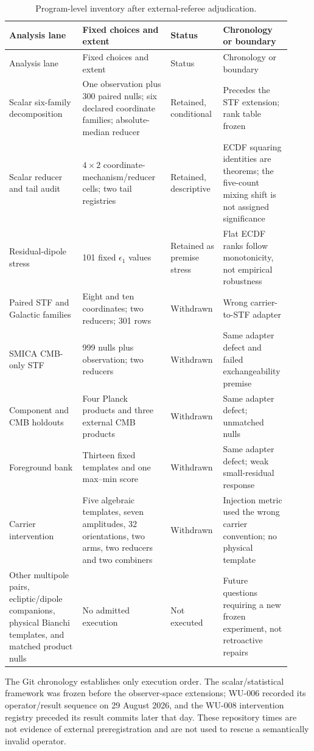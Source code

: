 \documentclass[11pt,a4paper]{article}
\begin{document}
\begin{longtable}{@{}p{0.25\linewidth}p{0.30\linewidth}p{0.15\linewidth}p{0.22\linewidth}@{}}
\caption{Program-level inventory after external-referee adjudication.}
\label{tab:analysis-inventory}\\
\toprule
Analysis lane & Fixed choices and extent & Status & Chronology or boundary\\
\midrule
\endfirsthead
\toprule
Analysis lane & Fixed choices and extent & Status & Chronology or boundary\\
\midrule
\endhead
Scalar six-family decomposition & One observation plus 300 paired nulls;
six declared coordinate families; absolute-median reducer & Retained,
conditional & Precedes the STF extension; rank table frozen\\
Scalar reducer and tail audit & $4\times2$ coordinate-mechanism/reducer cells;
two tail registries & Retained, descriptive & ECDF squaring identities are
theorems; the five-count mixing shift is not assigned significance\\
Residual-dipole stress & 101 fixed $\epsilon_1$ values & Retained as premise
stress & Flat ECDF ranks follow monotonicity, not empirical robustness\\
Paired STF and Galactic families & Eight and ten coordinates; two reducers;
301 rows & Withdrawn & Wrong carrier-to-STF adapter\\
SMICA CMB-only STF & 999 nulls plus observation; two reducers & Withdrawn &
Same adapter defect and failed exchangeability premise\\
Component and CMB holdouts & Four Planck products and three external CMB
products & Withdrawn & Same adapter defect; unmatched nulls\\
Foreground bank & Thirteen fixed templates and one max--min score & Withdrawn
& Same adapter defect; weak small-residual response\\
Carrier intervention & Five algebraic templates, seven amplitudes, 32
orientations, two arms, two reducers and two combiners & Withdrawn & Injection
metric used the wrong carrier convention; no physical template\\
Other multipole pairs, ecliptic/dipole companions, physical Bianchi templates,
and matched product nulls & No admitted execution & Not executed & Future
questions requiring a new frozen experiment, not retroactive repairs\\
\bottomrule
\end{longtable}

The Git chronology establishes only execution order.  The scalar/statistical
framework was frozen before the observer-space extensions; WU-006 recorded its
operator/result sequence on 29 August 2026, and the WU-008 intervention
registry preceded its result commits later that day.  These repository times
are not evidence of external preregistration and are not used to rescue a
semantically invalid operator.
\end{document}
